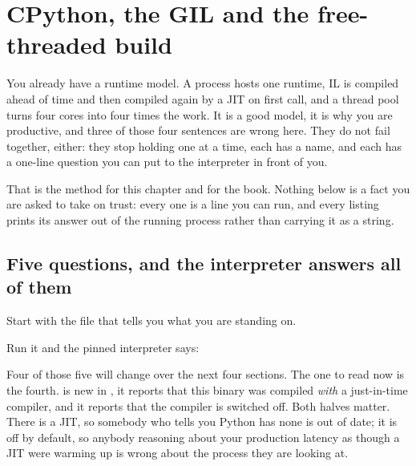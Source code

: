 
\chapter{CPython, the GIL and the free-threaded build}
\label{ch:runtime}

\noindent
You already have a runtime model. A process hosts one runtime, IL is
compiled ahead of time and then compiled again by a JIT on first call, and a
thread pool turns four cores into four times the work. It is a good model,
it is why you are productive, and three of those four sentences are wrong
here. They do not fail together, either: they stop holding one at a time,
each has a name, and each has a one-line question you can put to the
interpreter in front of you.

That is the method for this chapter and for the book. Nothing below is a
fact you are asked to take on trust: every one is a line you can run, and
every listing prints its answer out of the running process rather than
carrying it as a string.

\section{Five questions, and the interpreter answers all of them}
\label{sec:ch01-questions}

\noindent
Start with the file that tells you what you are standing on.


\noindent
Run it and the pinned interpreter says:


\noindent
Four of those five will change over the next four sections. The one to read
now is the fourth.  is new in \pyver, it reports that this
binary was compiled \emph{with} a just-in-time compiler, and it reports that
the compiler is switched off. Both halves matter. There is a JIT, so
somebody who tells you Python has none is out of date; it is off by default,
so anybody reasoning about your production latency as though a JIT were
warming up is wrong about the process they are looking at.

